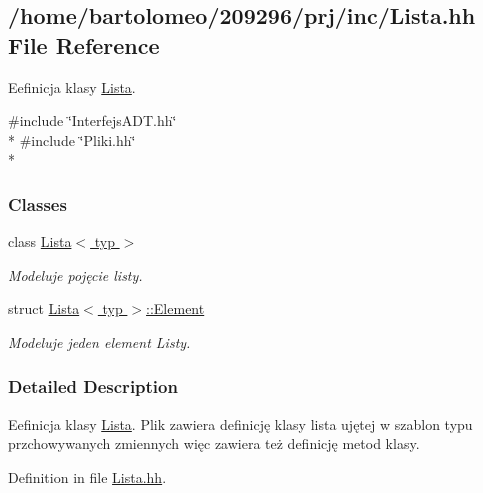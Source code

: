 \hypertarget{_lista_8hh}{\subsection{/home/bartolomeo/209296/prj/inc/\-Lista.hh File Reference}
\label{_lista_8hh}
}


Eefinicja klasy \hyperlink{class_lista}{Lista}.  


{\ttfamily \#include \char`\"{}Interfejs\-A\-D\-T.\-hh\char`\"{}}\\*
{\ttfamily \#include \char`\"{}Pliki.\-hh\char`\"{}}\\*
\subsubsection*{Classes}
\begin{DoxyCompactItemize}
\item 
class \hyperlink{class_lista}{Lista$<$ typ $>$}
\begin{DoxyCompactList}\small\item\em Modeluje pojęcie listy. \end{DoxyCompactList}\item 
struct \hyperlink{struct_lista_1_1_element}{Lista$<$ typ $>$\-::\-Element}
\begin{DoxyCompactList}\small\item\em Modeluje jeden element Listy. \end{DoxyCompactList}\end{DoxyCompactItemize}


\subsubsection{Detailed Description}
Eefinicja klasy \hyperlink{class_lista}{Lista}. Plik zawiera definicję klasy lista ujętej w szablon typu przchowywanych zmiennych więc zawiera też definicję metod klasy. 

Definition in file \hyperlink{_lista_8hh_source}{Lista.\-hh}.


